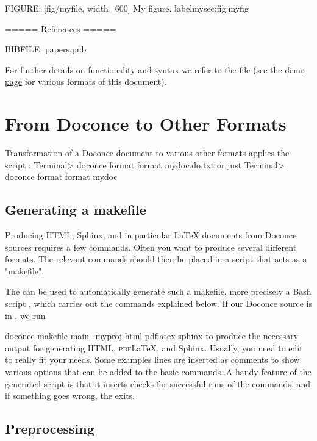 \documentclass[%
oneside,                 %
final,                   %
10pt]{article}
\begin{document}
FIGURE: [fig/myfile, width=600] My figure. label{mysec:fig:myfig}

===== References =====

BIBFILE: papers.pub
\eccq

For further details on functionality and
syntax we refer to the  file (see the
\href{{https://doconce.googlecode.com/hg/doc/demos/manual/index.html}}{demo page}
for various formats of this document).




\section{From Doconce to Other Formats}
\label{doconce2formats}

Transformation of a Doconce document  to various other
formats applies the script :
\bsys
Terminal> doconce format format mydoc.do.txt
\esys
or just
\bsys
Terminal> doconce format format mydoc
\esys

\subsection{Generating a makefile}

Producing HTML, Sphinx, and in particular {\LaTeX} documents from
Doconce sources requires a few commands. Often you want to
produce several different formats. The relevant commands should
then be placed in a script that acts as a "makefile".

The  can be used to automatically generate
such a makefile, more precisely a Bash script , which
carries out the commands explained below. If our Doconce source
is in , we run

\bsys
doconce makefile main_myproj html pdflatex sphinx
\esys
to produce the necessary output for generating HTML, \textsc{pdf}{\LaTeX}, and
Sphinx. Usually, you need to edit  to really fit your
needs. Some examples lines are inserted as comments to show
various options that can be added to the basic commands.
A handy feature of the generated  script is that it
inserts checks for successful runs of the  commands,
and if something goes wrong, the  exits.


\subsection{Preprocessing}
\end{document}
